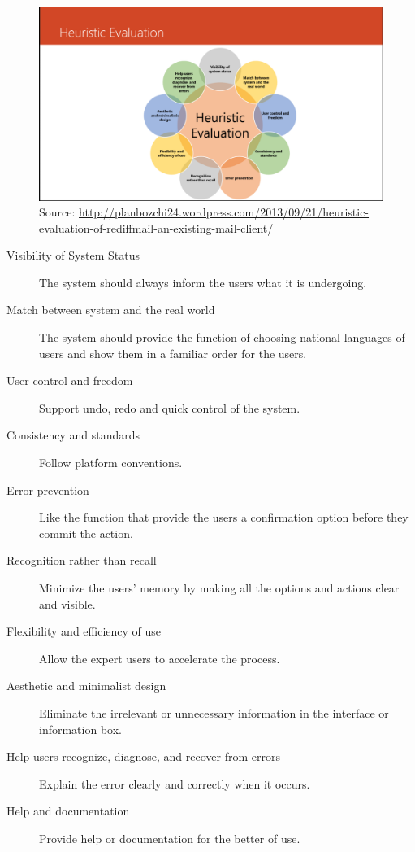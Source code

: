 \documentclass[twocolumn]{article}
\begin{document}
\begin{figure}
  \centering
  \includegraphics[width=\columnwidth, clip=true, trim=380 5 300 160]{fig/heuristic-evaluation.png}
  \caption{Source: \url{http://planbozchi24.wordpress.com/2013/09/21/heuristic-evaluation-of-rediffmail-an-existing-mail-client/}}
  \label{fig:heuristic-evaluation}
\end{figure}

\begin{description}
  \item[Visibility of System Status]
    The system should always inform the users what it is undergoing.
  \item[Match between system and the real world]
    The system should provide the function of choosing national languages of users and show them in a familiar order for the users.
  \item[User control and freedom]
    Support undo, redo and quick control of the system.
  \item[Consistency and standards]
    Follow platform conventions.
  \item[Error prevention]
    Like the function that provide the users a confirmation option before they commit the action.
  \item[Recognition rather than recall]
    Minimize the users’ memory by making all the options and actions clear and visible.
  \item[Flexibility and efficiency of use]
    Allow the expert users to accelerate the process.
  \item[Aesthetic and minimalist design]
    Eliminate the irrelevant or unnecessary information in the interface or information box.
  \item[Help users recognize, diagnose, and recover from errors]
    Explain the error clearly and correctly when it occurs.
  \item[Help and documentation]
    Provide help or documentation for the better of use.
\end{description}
\end{document}
